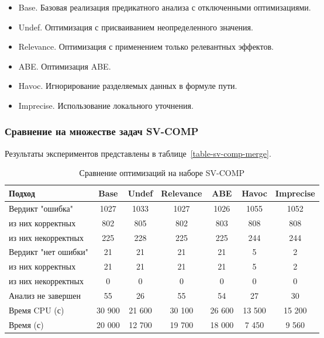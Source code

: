 \begin{itemize}
\item Base. Базовая реализация предикатного анализа с отключенными оптимизациями.
\item Undef. Оптимизация с присваиванием неопределенного значения.
\item Relevance. Оптимизация с применением только релевантных эффектов.
\item ABE. Оптимизация ABE.
\item Havoc. Игнорирование разделяемых данных в формуле пути.
\item Imprecise. Использование локального уточнения.
\end{itemize}

\subsubsection{Сравнение на множестве задач SV-COMP}

Результаты экспериментов представлены в таблице~\ref{table-sv-comp-merge}.

\begin{center}
  \begin{table}[h]\footnotesize
  	\label{table-sv-comp-opt}
    \caption{Сравнение оптимизаций на наборе SV-COMP}
    \begin{tabular}{ | l | c | c | c | c | c | c | }
      \hline
      Подход         				& Base 	& Undef 	& Relevance & ABE 	& Havoc 	&  Imprecise \\ \hline
      Вердикт "ошибка" 				& 1027  & 1033  	& 1027      & 1026  & 1055     	& 1052       \\ 
  \hspace{0.5cm} из них корректных 	& 802 	& 805 		& 802     	& 803   & 808    	& 808     	\\ 
  \hspace{0.5cm} из них некорректных & 225 	& 228 		& 225     	& 225  	& 244      	& 244       \\ \hline
      Вердикт "нет ошибки"  		& 21    & 21    	& 21    	& 21   	& 5     	& 2       \\ 
  \hspace{0.5cm} из них корректных 	& 21 	& 21    	& 21     	& 21   	& 5     	& 2       \\
  \hspace{0.5cm} из них некорректных & 0 	& 0    		& 0     	& 0   	& 0     	& 0       \\ \hline
      Анализ не завершен       		& 55     & 26     	& 55     	& 54   	& 27     	& 30      	\\ \hline
      Время CPU (с)   				& 30 900 & 21 600 	& 30 100  	& 26 600 & 13 500   & 15 200     	\\ 
      Время (с)  					& 20 000 & 12 700	& 19 700  	& 18 000 & 7 450   	& 9 560      	\\
      \hline
    \end{tabular}
  \end{table}
\end{center}

